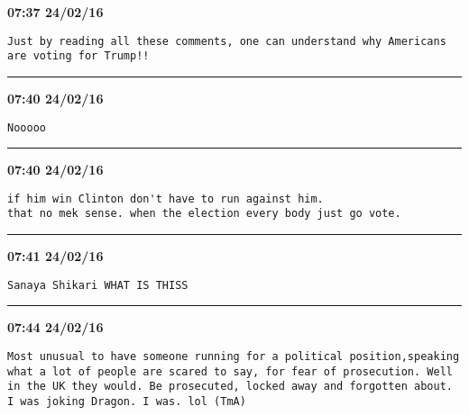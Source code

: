\begin{adjustwidth}{0cm}{0cm}
\footnotesize \textbf{07:37 24/02/16}

\begin{lstlisting}[breaklines, breakatwhitespace, basicstyle=\small, frame=leftline]
Just by reading all these comments, one can understand why Americans are voting for Trump!!
\end{lstlisting}
\end{adjustwidth}

\hrule%

\begin{adjustwidth}{0cm}{0cm}
\footnotesize \textbf{07:40 24/02/16}

\begin{lstlisting}[breaklines, breakatwhitespace, basicstyle=\small, frame=leftline]
Nooooo
\end{lstlisting}
\end{adjustwidth}

\hrule%

\begin{adjustwidth}{0cm}{0cm}
\footnotesize \textbf{07:40 24/02/16}

\begin{lstlisting}[breaklines, breakatwhitespace, basicstyle=\small, frame=leftline]
if him win Clinton don't have to run against him.
that no mek sense. when the election every body just go vote.
\end{lstlisting}
\end{adjustwidth}

\hrule%

\begin{adjustwidth}{0cm}{0cm}
\footnotesize \textbf{07:41 24/02/16}

\begin{lstlisting}[breaklines, breakatwhitespace, basicstyle=\small, frame=leftline]
Sanaya Shikari WHAT IS THISS
\end{lstlisting}
\end{adjustwidth}

\hrule%

\begin{adjustwidth}{0cm}{0cm}
\footnotesize \textbf{07:44 24/02/16}

\begin{lstlisting}[breaklines, breakatwhitespace, basicstyle=\small, frame=leftline]
Most unusual to have someone running for a political position,speaking what a lot of people are scared to say, for fear of prosecution. Well in the UK they would. Be prosecuted, locked away and forgotten about. I was joking Dragon. I was. lol (TmA)
\end{lstlisting}
\end{adjustwidth}

